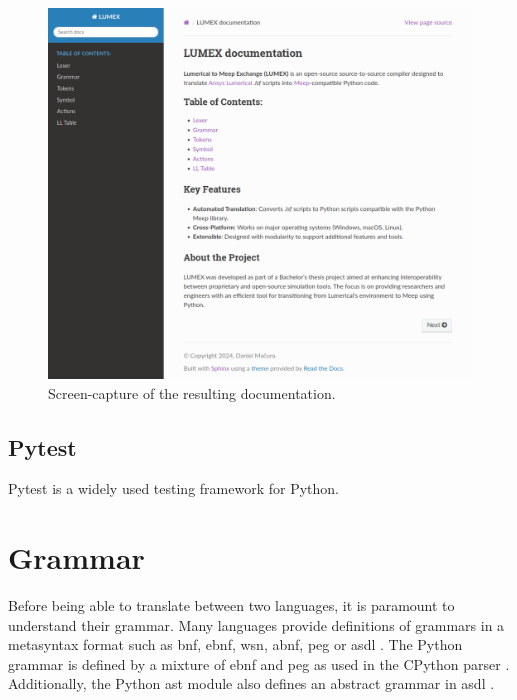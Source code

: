 \begin{figure}[H]

  \label{fig:compiler-stages}
  \centering
  \includegraphics[width=\textwidth]{obrazky-figures/sphinx-lumex.png}
  \caption{Screen-capture of the resulting documentation.}
\end{figure}

\subsection{Pytest}
Pytest is a widely used testing framework for Python. 





\section{Grammar}\label{grammar}
Before being able to translate between two languages, it is paramount to understand their grammar. Many languages provide definitions of grammars in a metasyntax format such as \gls{bnf}, \gls{ebnf}, \gls{wsn}, \gls{abnf}, \gls{peg} or \gls{asdl} \cite{asdl}. The Python grammar is defined by a mixture of \gls{ebnf} and \gls{peg} as used in the CPython parser \cite{python3grammar}. Additionally, the Python \gls{ast} module also defines an abstract grammar in \gls{asdl} \cite{python_ast}.

